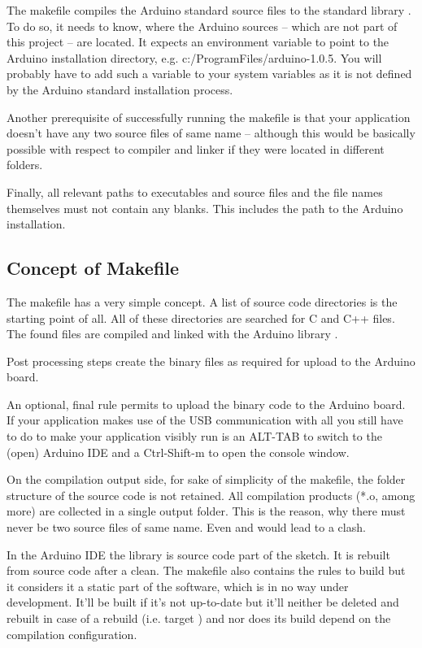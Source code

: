 The makefile compiles the Arduino standard source files to the standard
library . To do so, it needs to know, where the Arduino sources
-- which are not part of this project -- are located. It expects an
environment variable  to point to the Arduino
installation directory, e.g.
c:/ProgramFiles/\-arduino-1.0.5. You will
probably have to add such a variable to your system variables as it is not
defined by the Arduino standard installation process.

Another prerequisite of successfully running the makefile is that your
application doesn't have any two source files of same name -- although
this would be basically possible with respect to compiler and linker if
they were located in different folders.

Finally, all relevant paths to executables and source files and the file
names themselves must not contain any blanks. This includes the path to
the Arduino installation.

\subsection{Concept of Makefile}

The makefile has a very simple concept. A list of source code directories
is the starting point of all. All of these directories are searched for C
and C++ files. The found files are compiled and linked with the Arduino
library .

Post processing steps create the binary files as required for upload to
the Arduino board.

An optional, final rule permits to upload the binary code to the Arduino
board. If your application makes use of the USB communication with
 all you still have to do to make your application visibly
run is an ALT-TAB to switch to the (open) Arduino IDE and a Ctrl-Shift-m
to open the console window.

On the compilation output side, for sake of simplicity of the makefile,
the folder structure of the source code is not retained. All compilation
products (*.o, among more) are collected in a single output folder. This
is the reason, why there must never be two source files of same name. Even
 and  would lead to a clash.

In the Arduino IDE the library  is source code part of the
sketch. It is rebuilt from source code after a clean. The \rtos{} makefile
also contains the rules to build  but it considers it a
static part of the software, which is in no way under development. It'll
be built if it's not up-to-date but it'll neither be deleted and rebuilt
in case of a rebuild (i.e. target ) and nor does its build
depend on the compilation configuration.

